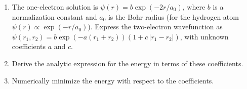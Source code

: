 \documentclass{article}
\begin{document}
\begin{enumerate}
\begin{enumerate}
\item The one-electron solution is $\psi(r) = b \exp(-2r/a_0)$, where $b$ is a normalization constant and $a_0$ is the Bohr radius (for the hydrogen atom $\psi(r) \propto \exp(-r/a_0)$). Express the two-electron wavefunction as $\psi(r_1,r_2) = b \exp(- a (r_1+r_2)) (1  + c\, |r_1-r_2|)$, with unknown coefficients $a$ and $c$. 

\item Derive the analytic expression for the energy in terms of these coefficients. 

\item Numerically minimize the energy with respect to the coefficients.

\end{enumerate}



\end{enumerate}
\end{document}
